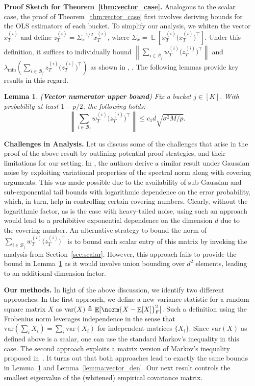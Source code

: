 \documentclass[letterpaper, 11 pt]{article}
\newcommand{\mc}{\mathcal}
\newcommand{\normlr}[1]{\left\lVert#1\right\rVert}
\DeclareMathOperator{\E}{\mathbb{E}}
\newtheorem{lemma}{Lemma}
\begin{document}
\textbf{Proof Sketch for Theorem~\ref{thm:vector_case}.} Analogous to the scalar case, the proof of Theorem~\ref{thm:vector_case} first involves deriving bounds for the OLS estimators of each bucket. To simplify our analysis, we whiten the vector $x_T^{(i)}$ and define $z_T^{(i)} = \Sigma_x^{-1/2}x_T^{(i)}$, where $\Sigma_x = \E[x_T^{(i)}\big(x_T^{(i)}\big)^{\top}]$. Under this definition, it suffices to individually bound $\normlr{\sum_{i \in \mc{B}_j} w_T^{(i)}\big(z_T^{(i)}\big)^{\top}}$ and $\lambda_{\min}{\left(\sum_{i \in \mc{B}_j} z_T^{(i)}\big(z_T^{(i)}\big)^{\top}\right)}$ as shown in \cite{dean2020sample}, \cite{matni2019tutorial}. The following lemmas provide key results in this regard.

\begin{lemma} \label{lemma:vector_num} (\textbf{Vector numerator upper bound}) Fix a bucket $j \in [K]$. With probability at least $1 - p/2$, the following holds:
$$\normlr{\sum_{i \in \mc{B}_j} w_T^{(i)}\big(z_T^{(i)}\big)^{\top}} \leq c_1 d \sqrt{\sigma^2 M/p}.$$
\end{lemma}

\textbf{Challenges in Analysis.} Let us discuss some of the challenges that arise in the proof of the above result by outlining potential proof strategies, and their limitations for our setting. In \cite{dean2020sample}, the authors derive a similar result under Gaussian noise by exploiting variational properties of the spectral norm along with covering arguments. This was made possible due to the availability of sub-Gaussian and sub-exponential tail bounds with logarithmic dependence on the error probability, which, in turn, help in controlling certain covering numbers. Clearly, without the logarithmic factor, as is the case with heavy-tailed noise, using such an approach would lead to a prohibitive exponential dependence on the dimension $d$ due to the covering number. An alternative strategy to bound the norm of $\sum_{i \in \mc{B}_j} w_T^{(i)}\big(z_T^{(i)}\big)^{\top}$ is to bound each scalar entry of this matrix by invoking the analysis from Section~\ref{sec:scalar}. However, this approach fails to provide the bound in Lemma~\ref{lemma:vector_num} as it would involve union bounding over $d^2$ elements, leading to an additional dimension factor. 

\textbf{Our methods.} In light of the above discussion, we identify two different approaches. In the first approach, we define a new variance statistic for a random square matrix $X$ as $\text{var}(X) \triangleq \E[\norm{X - \E[X]}_F^2]$. Such a definition using the Frobenius norm leverages independence in the sense that $\text{var}(\sum_i X_i) = \sum_i \text{var}(X_i)$ for independent matrices $\{X_i\}$. Since $\text{var}(X)$ as defined above is a scalar, one can use the standard Markov's inequality in this case. The second approach exploits a matrix version of Markov's inequality proposed in~\cite{ahlswede2001strong}. It turns out that both approaches lead to exactly the same bounds in Lemma~\ref{lemma:vector_num} and Lemma~\ref{lemma:vector_den}. Our next result controls the smallest eigenvalue of the (whitened) empirical covariance matrix.
\end{document}
